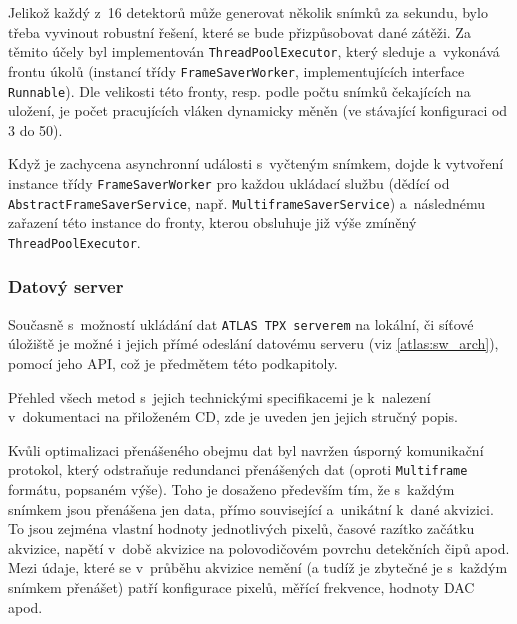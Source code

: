 Jelikož každý z~16 detektorů může generovat několik snímků za sekundu, bylo třeba vyvinout robustní řešení, které se bude přizpůsobovat dané zátěži. Za těmito účely byl implementován \texttt{ThreadPoolExecutor}, který sleduje a~vykonává frontu úkolů (instancí třídy \texttt{FrameSaverWorker}, implementujících interface \texttt{Runnable}). Dle velikosti této fronty, resp. podle počtu snímků čekajících na uložení, je počet pracujících vláken dynamicky měněn (ve stávající konfiguraci od 3 do 50). 

Když je zachycena asynchronní události s~vyčteným snímkem, dojde k vytvoření instance třídy \texttt{FrameSaverWorker} pro každou ukládací službu (dědící od \texttt{AbstractFrameSaverService}, např. \texttt{MultiframeSaverService}) a~následnému zařazení této instance do fronty, kterou obsluhuje již výše zmíněný \texttt{ThreadPoolExecutor}.

\newpage

\subsubsection{Datový server}\label{atlas:cont:output:dataserver}
Současně s~možností ukládání dat \texttt{ATLAS TPX serverem} na lokální, či síťové úložiště je možné i jejich přímé odeslání datovému serveru (viz \ref{atlas:sw_arch}), pomocí jeho API, což je předmětem této podkapitoly.

Přehled všech metod s~jejich technickými specifikacemi je k~nalezení v~dokumentaci na přiloženém CD, zde je uveden jen jejich stručný popis.

Kvůli optimalizaci přenášeného obejmu dat byl navržen úsporný komunikační protokol, který odstraňuje redundanci přenášených dat (oproti \texttt{Multiframe} formátu, popsaném výše). Toho je dosaženo především tím, že s~každým snímkem jsou přenášena jen data, přímo související a~unikátní k~dané akvizici. To jsou zejména vlastní hodnoty jednotlivých pixelů, časové razítko začátku akvizice, napětí v~době akvizice na polovodičovém povrchu detekčních čipů apod. Mezi údaje, které se v~průběhu akvizice nemění (a tudíž je zbytečné je s~každým snímkem přenášet) patří konfigurace pixelů, měřící frekvence, hodnoty DAC apod.

